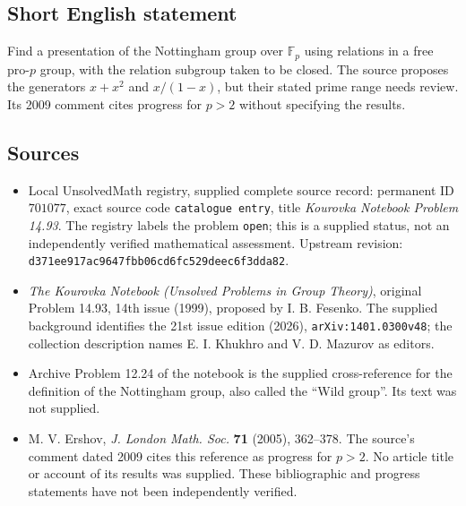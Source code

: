 \documentclass[11pt]{article}
\newcommand{\F}{\mathbb{F}}
\begin{document}
\subsection{Short English statement}
Find a presentation of the Nottingham group over \(\F_p\) using relations in a free pro-\(p\) group, with the relation subgroup taken to be closed. The source proposes the generators \(x+x^2\) and \(x/(1-x)\), but their stated prime range needs review. Its 2009 comment cites progress for \(p>2\) without specifying the results.
\subsection{Sources}
\begin{itemize}
\item Local UnsolvedMath registry, supplied complete source record: permanent ID \(701077\), exact source code \texttt{catalogue entry}, title \emph{Kourovka Notebook Problem 14.93}. The registry labels the problem \texttt{open}; this is a supplied status, not an independently verified mathematical assessment. Upstream revision: \texttt{d371ee917ac9647fbb06cd6fc529deec6f3dda82}.
\item \emph{The Kourovka Notebook (Unsolved Problems in Group Theory)}, original Problem 14.93, 14th issue (1999), proposed by I. B. Fesenko. The supplied background identifies the 21st issue edition (2026), \texttt{arXiv:1401.0300v48}; the collection description names E. I. Khukhro and V. D. Mazurov as editors.
\item Archive Problem 12.24 of the notebook is the supplied cross-reference for the definition of the Nottingham group, also called the ``Wild group''. Its text was not supplied.
\item M. V. Ershov, \emph{J. London Math. Soc.} \textbf{71} (2005), 362--378. The source's comment dated 2009 cites this reference as progress for \(p>2\). No article title or account of its results was supplied. These bibliographic and progress statements have not been independently verified.
\end{itemize}
\end{document}
